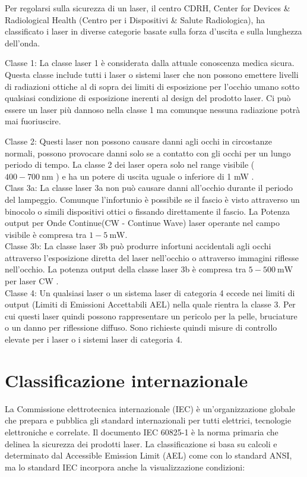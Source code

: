 \documentclass[10pt]{article}
\begin{document}
Per regolarsi sulla sicurezza di un laser, il centro CDRH, Center for Devices \& Radiological Health (Centro per i Dispositivi \& Salute Radiologica), ha classificato i laser in diverse categorie basate sulla forza d'uscita e sulla lunghezza dell'onda.

Classe 1: La classe laser 1 è considerata dalla attuale conoscenza medica sicura. Questa classe include tutti i laser o sistemi laser che non possono emettere livelli di radiazioni ottiche al di sopra dei limiti di esposizione per l'occhio umano sotto qualsiasi condizione di esposizione inerenti al design del prodotto laser. Ci può essere un laser più dannoso nella classe 1 ma comunque nessuna radiazione potrà mai fuoriuscire.

Classe 2: Questi laser non possono causare danni agli occhi in circostanze normali, possono provocare danni solo se a contatto con gli occhi per un lungo periodo di tempo. La classe 2 dei laser opera solo nel range visibile ( $400-700 \mathrm{~nm}$ ) e ha un potere di uscita uguale o inferiore di 1 mW .\\
Class 3a: La classe laser 3a non può causare danni all'occhio durante il periodo del lampeggio. Comunque l'infortunio è possibile se il fascio è visto attraverso un binocolo o simili dispositivi ottici o fissando direttamente il fascio. La Potenza output per Onde Continue(CW - Continue Wave) laser operante nel campo visibile è compresa tra $1-5 \mathrm{~mW}$.\\
Classe 3b: La classe laser 3b può produrre infortuni accidentali agli occhi attraverso l'esposizione diretta del laser nell'occhio o attraverso immagini riflesse nell'occhio. La potenza output della classe laser 3b è compresa tra $5-500 \mathrm{~mW}$ per laser CW .\\
Classe 4: Un qualsiasi laser o un sistema laser di categoria 4 eccede nei limiti di output (Limiti di Emissioni Accettabili AEL) nella quale rientra la classe 3. Per cui questi laser quindi possono rappresentare un pericolo per la pelle, bruciature o un danno per riflessione diffuso. Sono richieste quindi misure di controllo elevate per i laser o i sistemi laser di categoria 4.

\section{Classificazione internazionale}
La Commissione elettrotecnica internazionale (IEC) è un'organizzazione globale che prepara e pubblica gli standard internazionali per tutti elettrici, tecnologie elettroniche e correlate. Il documento IEC 60825-1 è la norma primaria che delinea la sicurezza dei prodotti laser. La classificazione si basa su calcoli e determinato dal Accessible Emission Limit (AEL) come con lo standard ANSI, ma lo standard IEC incorpora anche la visualizzazione condizioni:
\end{document}
